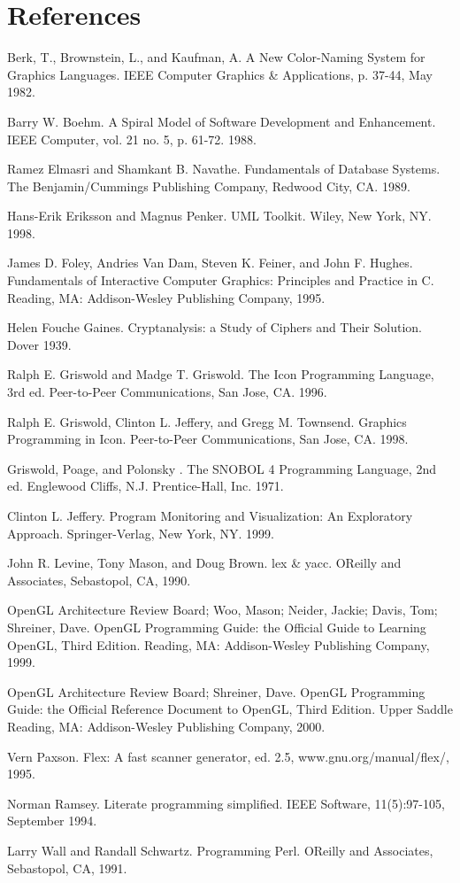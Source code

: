 \clearpage\section{References}

Berk, T., Brownstein, L., and Kaufman, A. A New Color-Naming System for
Graphics Languages. IEEE Computer Graphics \& Applications, p. 37-44,
May 1982.

Barry W. Boehm. A Spiral Model of Software Development and Enhancement.
IEEE Computer, vol. 21 no. 5, p. 61-72. 1988.

Ramez Elmasri and Shamkant B. Navathe. Fundamentals of Database Systems.
The Benjamin/Cummings Publishing Company, Redwood City, CA. 1989.

Hans-Erik Eriksson and Magnus Penker. UML Toolkit. Wiley, New York, NY.
1998.

James D. Foley, Andries Van Dam, Steven K. Feiner, and John F. Hughes.
Fundamentals of Interactive Computer Graphics: Principles and Practice
in C. Reading, MA: Addison-Wesley Publishing Company, 1995.

Helen Fouche Gaines. {\textquotedbl}Cryptanalysis: a Study of Ciphers
and Their Solution{\textquotedbl}. Dover 1939.

Ralph E. Griswold and Madge T. Griswold. The Icon Programming Language,
3rd ed. Peer-to-Peer Communications, San Jose, CA. 1996.

Ralph E. Griswold, Clinton L. Jeffery, and Gregg M. Townsend. Graphics
Programming in Icon. Peer-to-Peer Communications, San Jose, CA. 1998.

Griswold, Poage, and Polonsky . The SNOBOL 4 Programming Language, 2nd
ed. Englewood Cliffs, N.J. Prentice-Hall, Inc. 1971.

Clinton L. Jeffery. Program Monitoring and Visualization: An Exploratory
Approach. Springer-Verlag, New York, NY. 1999.

John R. Levine, Tony Mason, and Doug Brown. lex \& yacc.
O{\textquotesingle}Reilly and Associates, Sebastopol, CA, 1990.

OpenGL Architecture Review Board; Woo, Mason; Neider, Jackie; Davis,
Tom; Shreiner, Dave. OpenGL Programming Guide: the Official Guide to
Learning OpenGL, Third Edition. Reading, MA: Addison-Wesley Publishing
Company, 1999.

OpenGL Architecture Review Board; Shreiner, Dave. OpenGL Programming
Guide: the Official Reference Document to OpenGL, Third Edition. Upper
Saddle Reading, MA: Addison-Wesley Publishing Company, 2000.

Vern Paxson. Flex: A fast scanner generator, ed. 2.5,
www.gnu.org/manual/flex/, 1995.

Norman Ramsey. Literate programming simplified. IEEE Software,
11(5):97-105, September 1994. 

Larry Wall and Randall Schwartz. Programming Perl.
O{\textquotesingle}Reilly and Associates, Sebastopol, CA, 1991.
